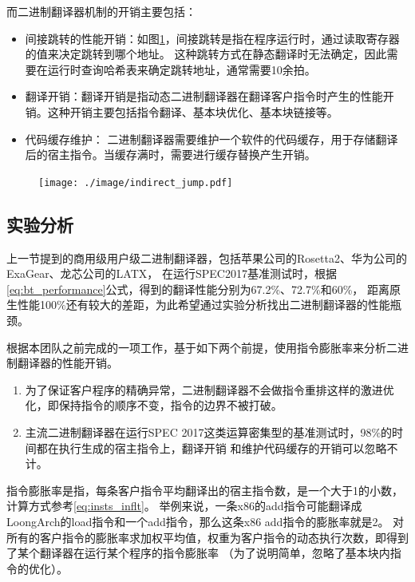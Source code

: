 而二进制翻译器机制的开销主要包括：
\begin{itemize}
\item 间接跳转的性能开销：如图\ref{img:indirect_jump}，间接跳转是指在程序运行时，通过读取寄存器的值来决定跳转到哪个地址。
这种跳转方式在静态翻译时无法确定，因此需要在运行时查询哈希表来确定跳转地址，通常需要10余拍。
\item 翻译开销：翻译开销是指动态二进制翻译器在翻译客户指令时产生的性能开销。这种开销主要包括指令翻译、基本块优化、基本块链接等。
\item 代码缓存维护： 二进制翻译器需要维护一个软件的代码缓存，用于存储翻译后的宿主指令。当缓存满时，需要进行缓存替换产生开销。
\end{itemize}

\begin{figure}[!htbp]
  \centering
  \texttt{[image: ./image/indirect\_jump.pdf]}
  \label{img:indirect_jump}
\end{figure}

\subsection{实验分析}

上一节提到的商用级用户级二进制翻译器，包括苹果公司的Rosetta2、华为公司的ExaGear、龙芯公司的LATX，
在运行SPEC2017基准测试时，根据\ref{eq:bt_performance}公式，得到的翻译性能分别为67.2\%、72.7\%和60\%，
距离原生性能100\%还有较大的差距，为此希望通过实验分析找出二进制翻译器的性能瓶颈。


根据本团队之前完成的一项工作\cite{deflater}，基于如下两个前提，使用指令膨胀率来分析二进制翻译器的性能开销。
\begin{enumerate}
\item  为了保证客户程序的精确异常，二进制翻译器不会做指令重排这样的激进优化，即保持指令的顺序不变，指令的边界不被打破。
\item  主流二进制翻译器在运行SPEC 2017这类运算密集型的基准测试时，98\%的时间都在执行生成的宿主指令上，翻译开销
和维护代码缓存的开销可以忽略不计。
\end{enumerate}

指令膨胀率是指，每条客户指令平均翻译出的宿主指令数，是一个大于1的小数，计算方式参考\ref{eq:insts_inflt}。
举例来说，一条x86的add指令可能翻译成LoongArch的load指令和一个add指令，那么这条x86 add指令的膨胀率就是2。
对所有的客户指令的膨胀率求加权平均值，权重为客户指令的动态执行次数，即得到了某个翻译器在运行某个程序的指令膨胀率
（为了说明简单，忽略了基本块内指令的优化）。

